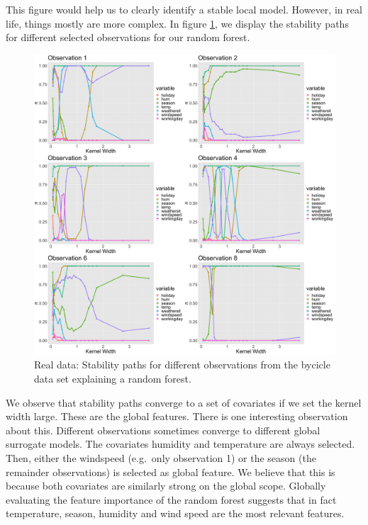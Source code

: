 \documentclass[]{krantz}
\begin{document}
This figure would help us to clearly identify a stable local model.
However, in real life, things mostly are more complex. In figure
\ref{fig:lime-fig14}, we display the stability paths for different
selected observations for our random forest.

\begin{figure}

{\centering \includegraphics[width=0.99\linewidth]{images/04-09-15} 

}

\caption{Real data: Stability paths for different observations from the bycicle data set explaining a random forest.}\label{fig:lime-fig14}
\end{figure}

We observe that stability paths converge to a set of covariates if we
set the kernel width large. These are the global features. There is one
interesting observation about this. Different observations sometimes
converge to different global surrogate models. The covariates humidity
and temperature are always selected. Then, either the windspeed
(e.g.~only observation 1) or the season (the remainder observations) is
selected as global feature. We believe that this is because both
covariates are similarly strong on the global scope. Globally evaluating
the feature importance of the random forest suggests that in fact
temperature, season, humidity and wind speed are the most relevant
features.
\end{document}
